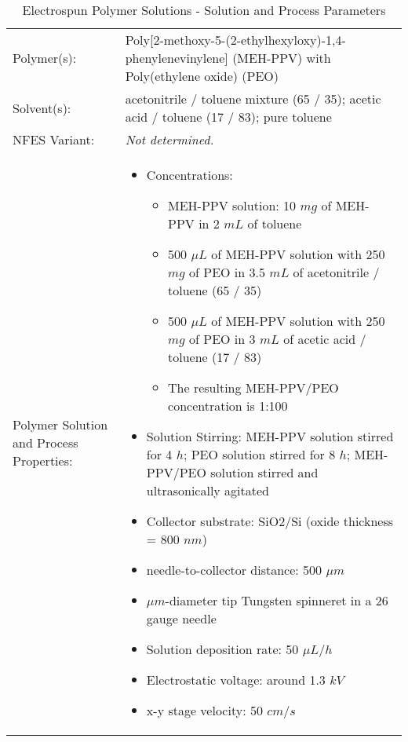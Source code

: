 
\begin{table}[th]
\caption{Electrospun Polymer Solutions - Solution and Process Parameters}
\begin{tabular}{
>{\raggedright\arraybackslash}p{}
>{\raggedright\arraybackslash}p{} }

\hline
Polymer(s): &
Poly[2-methoxy-5-(2-ethylhexyloxy)-1,4-phenylenevinylene] (MEH-PPV) with Poly(ethylene oxide) (PEO) \\

\arrayrulecolor{lightgray}\hline
Solvent(s): &
acetonitrile / toluene mixture (65 / 35); acetic acid / toluene (17 / 83); pure toluene \\

\hline
NFES Variant: &
\emph{Not determined.} \\

\hline
Polymer Solution and Process Properties: &
\begin{itemize}[leftmargin=*]
\item Concentrations:
    \begin{itemize}[leftmargin=*]
    \item MEH-PPV solution: 10 $m g$ of MEH-PPV in 2 $m L$ of toluene
    \item 500 $\mu L$ of MEH-PPV solution with 250 $m g$ of PEO in 3.5 $m L$ of acetonitrile / toluene (65 / 35)
    \item 500 $\mu L$ of MEH-PPV solution with 250 $m g$ of PEO in 3 $m L$ of acetic acid / toluene (17 / 83)
    \item The resulting MEH-PPV/PEO concentration is 1:100
    \end{itemize}
\item Solution Stirring: MEH-PPV solution stirred for 4 $h$; PEO solution stirred for 8 $h$; MEH-PPV/PEO solution stirred and ultrasonically agitated
\item Collector substrate: SiO2/Si (oxide thickness = 800 $n m$)
\item needle-to-collector distance: 500 $\mu m$
\item $\mu m$-diameter tip Tungsten spinneret in a 26 gauge needle
\item Solution deposition rate: 50 $\mu L / h$
\item Electrostatic voltage: around 1.3 $k V$
\item x-y stage velocity: 50 $c m / s$
\end{itemize} \\


\end{tabular}
\end{table}
